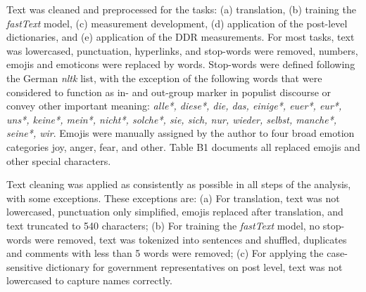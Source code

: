 \documentclass[
]{ccr}
\begin{document}
Text was cleaned and preprocessed for the tasks: (a) translation, (b)
training the \emph{fastText} model, (c) measurement development, (d)
application of the post-level dictionaries, and (e) application of the
DDR measurements. For most tasks, text was lowercased, punctuation,
hyperlinks, and stop-words were removed, numbers, emojis and emoticons
were replaced by words. Stop-words were defined following the German
\emph{nltk} list, with the exception of the following words that were
considered to function as in- and out-group marker in populist discourse
or convey other important meaning: \emph{alle*, diese*, die, das,
einige*, euer*, eur*, uns*, keine*, mein*, nicht*, solche*, sie, sich,
nur, wieder, selbst, manche*, seine*, wir}. Emojis were manually
assigned by the author to four broad emotion categories joy, anger,
fear, and other. Table B1 documents all replaced emojis and other
special characters.

Text cleaning was applied as consistently as possible in all steps of
the analysis, with some exceptions. These exceptions are: (a) For
translation, text was not lowercased, punctuation only simplified,
emojis replaced after translation, and text truncated to 540 characters;
(b) For training the \emph{fastText} model, no stop-words were removed,
text was tokenized into sentences and shuffled, duplicates and comments
with less than 5 words were removed; (c) For applying the case-sensitive
dictionary for government representatives on post level, text was not
lowercased to capture names correctly.
\end{document}
